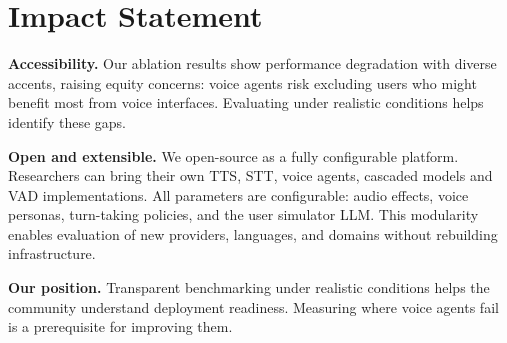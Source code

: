 \section*{Impact Statement}


\textbf{Accessibility.} Our ablation results show performance degradation with diverse accents, raising equity concerns: voice agents risk excluding users who might benefit most from voice interfaces. Evaluating under realistic conditions helps identify these gaps.

\textbf{Open and extensible.} We open-source \tauvoice{} as a fully configurable platform. Researchers can bring their own TTS, STT, voice agents, cascaded models and VAD implementations. All parameters are configurable: audio effects, voice personas, turn-taking policies, and the user simulator LLM. This modularity enables evaluation of new providers, languages, and domains without rebuilding infrastructure.

\textbf{Our position.} Transparent benchmarking under realistic conditions helps the community understand deployment readiness. Measuring where voice agents fail is a prerequisite for improving them.
